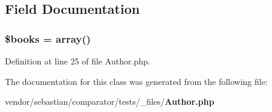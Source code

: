 \subsection{Field Documentation}
\subsubsection[{\$books}]{\setlength{\rightskip}{0pt plus 5cm}\$books = array()}\label{class_sebastian_bergmann_1_1_comparator_1_1_author_a907555e6b68ea0e7a98690e57bc2878a}


Definition at line 25 of file Author.\+php.



The documentation for this class was generated from the following file\+:\begin{DoxyCompactItemize}
\item 
vendor/sebastian/comparator/tests/\+\_\+files/{\bf Author.\+php}\end{DoxyCompactItemize}

